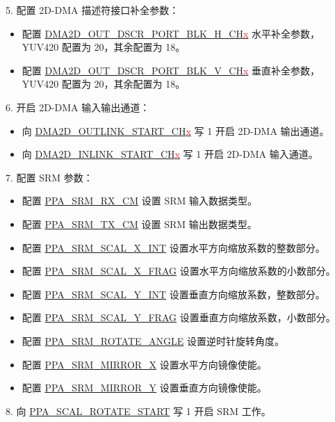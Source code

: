 \documentclass[main\_\_CN.tex]{subfiles}
\begin{document}
5. 配置 2D-DMA 描述符接口补全参数：
\begin{itemize}
    \item 配置 \hyperref[fielddesc:DMA2DOUTDSCRPORTBLKHCHN]{DMA2D\_OUT\_DSCR\_PORT\_BLK\_H\_CH\textcolor{red}{x}} 水平补全参数，YUV420 配置为 20，其余配置为 18。
    \item 配置 \hyperref[fielddesc:DMA2DOUTDSCRPORTBLKVCHN]{DMA2D\_OUT\_DSCR\_PORT\_BLK\_V\_CH\textcolor{red}{x}} 垂直补全参数，YUV420 配置为 20，其余配置为 18。
\end{itemize}

6. 开启 2D-DMA 输入输出通道：
\begin{itemize}
    \item 向 \hyperref[fielddesc:DMA2DOUTLINKSTARTCHN]{DMA2D\_OUTLINK\_START\_CH\textcolor{red}{x}} 写 1 开启 2D-DMA 输出通道。
    \item 向 \hyperref[fielddesc:DMA2DINLINKSTARTCHN]{DMA2D\_INLINK\_START\_CH\textcolor{red}{x}} 写 1 开启 2D-DMA 输入通道。
\end{itemize}

7. 配置 SRM 参数：
\begin{itemize}
    \item 配置 \hyperref[fielddesc:PPASRMRXCM]{PPA\_SRM\_RX\_CM} 设置 SRM 输入数据类型。
    \item 配置 \hyperref[fielddesc:PPASRMTXCM]{PPA\_SRM\_TX\_CM} 设置 SRM 输出数据类型。
    \item 配置 \hyperref[fielddesc:PPASRMSCALXINT]{PPA\_SRM\_SCAL\_X\_INT} 设置水平方向缩放系数的整数部分。
    \item 配置 \hyperref[fielddesc:PPASRMSCALXFRAG]{PPA\_SRM\_SCAL\_X\_FRAG} 设置水平方向缩放系数的小数部分。
    \item 配置 \hyperref[fielddesc:PPASRMSCALYINT]{PPA\_SRM\_SCAL\_Y\_INT} 设置垂直方向缩放系数，整数部分。
    \item 配置 \hyperref[fielddesc:PPASRMSCALYFRAG]{PPA\_SRM\_SCAL\_Y\_FRAG} 设置垂直方向缩放系数，小数部分。
    \item 配置 \hyperref[fielddesc:PPASRMROTATEANGLE]{PPA\_SRM\_ROTATE\_ANGLE} 设置逆时针旋转角度。
    \item 配置 \hyperref[fielddesc:PPASRMMIRRORX]{PPA\_SRM\_MIRROR\_X} 设置水平方向镜像使能。
    \item 配置 \hyperref[fielddesc:PPASRMMIRRORY]{PPA\_SRM\_MIRROR\_Y} 设置垂直方向镜像使能。
\end{itemize}

8. 向 \hyperref[fielddesc:PPASCALROTATESTART]{PPA\_SCAL\_ROTATE\_START} 写 1 开启 SRM 工作。
\end{document}
